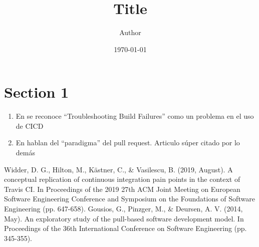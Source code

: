 \documentclass[11pt]{article}
\title{ Title}
\author{ Author }
\date{\today}
\begin{document}
\maketitle	

\section{Section 1}
\begin{enumerate}
\item En \cite{ref1} se reconoce ``Troubleshooting Build Failures'' como un problema en el uso de CICD
\item En \cite{ref2} hablan del ``paradigma'' del pull request. Articulo súper citado por lo demás
\end{enumerate}

\begin{thebibliography}{99}
Widder, D. G., Hilton, M., Kästner, C., \& Vasilescu, B. (2019, August). A conceptual replication of continuous integration pain points in the context of Travis CI. In Proceedings of the 2019 27th ACM Joint Meeting on European Software Engineering Conference and Symposium on the Foundations of Software Engineering (pp. 647-658).
Gousios, G., Pinzger, M., \& Deursen, A. V. (2014, May). An exploratory study of the pull-based software development model. In Proceedings of the 36th International Conference on Software Engineering (pp. 345-355).
\end{thebibliography}
\end{document}
